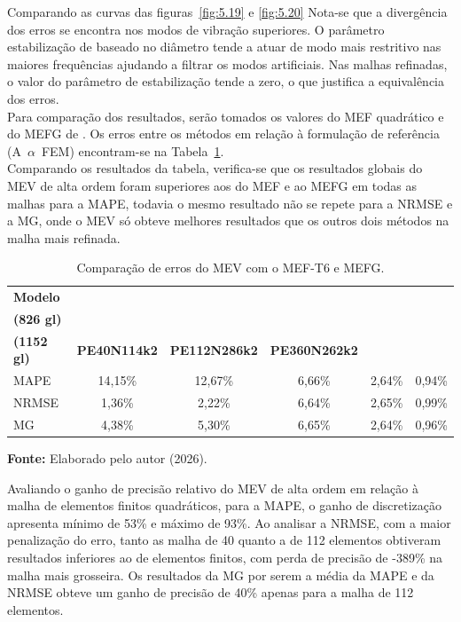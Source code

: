 \indent Comparando as curvas das figuras~\ref{fig:5.19} e \ref{fig:5.20} Nota-se que a divergência dos erros se encontra nos modos de vibração superiores. O parâmetro estabilização de baseado no diâmetro tende a atuar de modo mais restritivo nas maiores frequências ajudando a filtrar os modos artificiais. Nas malhas refinadas, o valor do parâmetro de estabilização tende a zero, o que justifica a equivalência dos erros.\\
\indent Para comparação dos resultados, serão tomados os valores do MEF quadrático e do MEFG de \citet{custodio2022metodo}. Os erros entre os métodos em relação à formulação de referência (A~$\alpha$~FEM) encontram-se na Tabela~\ref{tab:5.22}. \\
\indent Comparando os resultados da tabela, verifica-se que os resultados globais do MEV de alta ordem foram superiores aos do MEF e ao MEFG em todas as malhas para a MAPE, todavia o mesmo resultado não se repete para a NRMSE e a MG, onde o MEV só obteve melhores resultados que os outros dois métodos na malha mais refinada.


\begin{table}[htbp]
    \centering
    \caption{Comparação de erros do MEV com o MEF-T6 e MEFG.}
    \label{tab:5.22}
    \small %
    \begin{tabular}{lccccc}
        \toprule
        \textbf{Modelo} & 
        \makecell{\textbf{MEF}\\\textbf{(826 gl)}} & 
        \makecell{\textbf{MEFG}\\\textbf{(1152 gl)}} & 
        \textbf{PE40N114k2} & 
        \textbf{PE112N286k2} & 
        \textbf{PE360N262k2} \\
        \midrule
        MAPE  & 14,15\% & 12,67\% & 6,66\% & 2,64\% & 0,94\% \\
        NRMSE & 1,36\%  & 2,22\%  & 6,64\% & 2,65\% & 0,99\% \\
        MG    & 4,38\%  & 5,30\%  & 6,65\% & 2,64\% & 0,96\% \\
        \bottomrule
    \end{tabular}
    
    \vspace{0.2cm}
    \raggedright
    \textbf{Fonte:} Elaborado pelo autor (2026).
\end{table}

\indent Avaliando o ganho de precisão relativo do MEV de alta ordem em relação à malha de elementos finitos quadráticos, para a MAPE, o ganho de discretização apresenta mínimo de 53\% e máximo de 93\%. Ao analisar a NRMSE, com a maior penalização do erro, tanto as malha de 40 quanto a de 112 elementos obtiveram resultados inferiores ao de elementos finitos, com perda de precisão de -389\% na malha mais grosseira. Os resultados da MG por serem a média da MAPE e da NRMSE obteve um ganho de precisão de 40\% apenas para a malha de 112 elementos.

